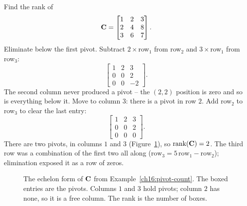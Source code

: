 \begin{example}\label{ch16:pivot-count}
Find the rank of
\[
  \mathbf{C} = \begin{bmatrix} 1 & 2 & 3 \\ 2 & 4 & 8 \\ 3 & 6 & 7 \end{bmatrix}.
\]
Eliminate below the first pivot. Subtract $2\times$row$_1$ from row$_2$ and
$3\times$row$_1$ from row$_3$:
\[
  \begin{bmatrix} 1 & 2 & 3 \\ 0 & 0 & 2 \\ 0 & 0 & -2 \end{bmatrix}.
\]
The second column never produced a pivot -- the $(2,2)$ position is zero and so
is everything below it. Move to column $3$: there is a pivot in row $2$. Add
row$_2$ to row$_3$ to clear the last entry:
\[
  \begin{bmatrix} 1 & 2 & 3 \\ 0 & 0 & 2 \\ 0 & 0 & 0 \end{bmatrix}.
\]
There are two pivots, in columns $1$ and $3$ (Figure~\ref{ch16:pivots}), so
$\operatorname{rank}(\mathbf{C}) = 2$. The third row was a combination of the first two all
along ($\text{row}_3 = 5\,\text{row}_1 - \text{row}_2$); elimination exposed it
as a row of zeros.
\end{example}

\begin{figure}[htbp]
\centering
{}
\caption{The echelon form of $\protect\mathbf{C}$ from
Example~\protect\ref{ch16:pivot-count}. The boxed entries are the pivots. Columns
$1$ and $3$ hold pivots; column $2$ has none, so it is a free column. The rank is
the number of boxes.}
\label{ch16:pivots}
\end{figure}

